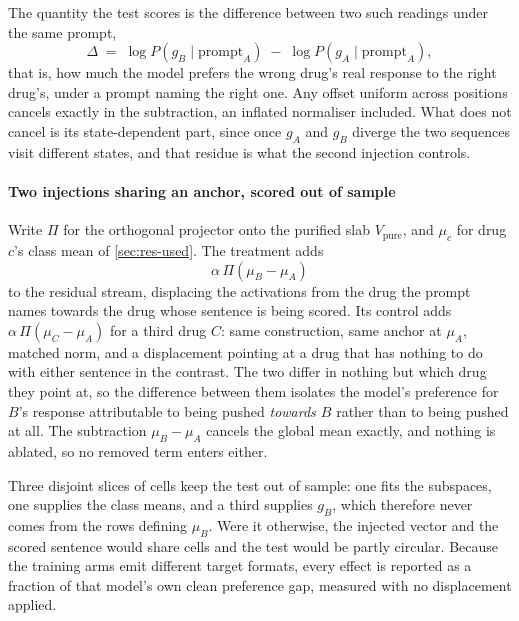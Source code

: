 The quantity the test scores is the difference between two such readings under
the same prompt,
\begin{equation}
  \Delta \;=\;
  \log P\!\left(g_B \mid \textrm{prompt}_A\right) \;-\;
  \log P\!\left(g_A \mid \textrm{prompt}_A\right),
\end{equation}
that is, how much the model prefers the wrong drug's real response to the right
drug's, under a prompt naming the right one. Any offset uniform across positions
cancels exactly in the subtraction, an inflated normaliser included. What does
not cancel is its state-dependent part, since once $g_A$ and $g_B$ diverge the
two sequences visit different states, and that residue is what the second
injection controls.

\paragraph{Two injections sharing an anchor, scored out of sample} Write $\Pi$
for the orthogonal projector onto the purified slab $V_{\textrm{pure}}$, and
$\mu_c$ for drug $c$'s class mean of \cref{sec:res-used}. The treatment adds
\begin{equation}
  \alpha \, \Pi\!\left(\mu_B - \mu_A\right)
\end{equation}
to the residual stream, displacing the activations from the drug the prompt
names towards the drug whose sentence is being scored. Its control adds
$\alpha\,\Pi(\mu_C - \mu_A)$ for a third drug $C$: same construction, same
anchor at $\mu_A$, matched norm, and a displacement pointing at a drug that has
nothing to do with either sentence in the contrast. The two differ in nothing
but which drug they point at, so the difference between them isolates the
model's preference for $B$'s response attributable to being pushed
\emph{towards $B$} rather than to being pushed at all. The subtraction
$\mu_B - \mu_A$ cancels the global mean exactly, and nothing is ablated, so no
removed term enters either.

Three disjoint slices of cells keep the test out of sample: one fits the
subspaces, one supplies the class means, and a third supplies $g_B$, which
therefore never comes from the rows defining $\mu_B$. Were it otherwise, the
injected vector and the scored sentence would share cells and the test would be
partly circular. Because the training arms emit different target formats, every
effect is reported as a fraction of that model's own clean preference gap,
measured with no displacement applied.

